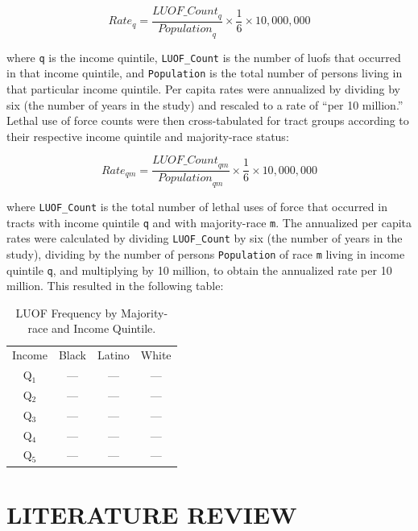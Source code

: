 \documentclass[12pt]{article}
\begin{document}
\begin{equation}
{Rate}_q=\frac{{LUOF\_Count}_q}{{Population}_q}\times\frac{1}{6}\times10,000,000
\label{eq:quintile_rate}
\end{equation}

\noindent{}where \texttt{q} is the income quintile, \texttt{LUOF\_Count} is the number of \acrshort{luof}s that occurred in that income quintile, and \texttt{Population} is the total number of persons living in that particular income quintile. Per capita rates were annualized by dividing by six (the number of years in the study) and rescaled to a rate of “per 10 million.” Lethal use of force counts were then cross-tabulated for tract groups according to their respective income quintile and majority-race status:

\begin{equation}
{Rate}_{qm}=\frac{{LUOF\_Count}_{qm}}{{Population}_{qm}}\times\frac{1}{6}\times10,000,000
\label{eq:quintile_majority_rate}
\end{equation}

\noindent{}where \texttt{LUOF\_Count} is the total number of lethal uses of force that occurred in tracts with income quintile \texttt{q} and with majority-race \texttt{m}. The annualized per capita rates were calculated by dividing \texttt{LUOF\_Count} by six (the number of years in the study), dividing by the number of persons \texttt{Population} of race \texttt{m} living in income quintile \texttt{q}, and multiplying by 10 million, to obtain the annualized rate per 10 million. This resulted in the following table:

\begin{table}[h]
\centering
\begin{tabular}{cccc} %
Income&Black&Latino&White\\
Q$_1$ &---&---&---\\
Q$_2$ &---&---&---\\
Q$_3$ &---&---&---\\
Q$_4$ &---&---&---\\
Q$_5$ &---&---&---\\
\end{tabular}
  \captionsetup{justification=centering, singlelinecheck=false, margin=2cm}
  \caption[LUOF Frequency: Majority-race and Income Quintile]{LUOF Frequency by Majority-race and Income Quintile.}
  \label{tab:luof_freq_majority_quintile}
\end{table}

\section{LITERATURE REVIEW}\
\end{document}
